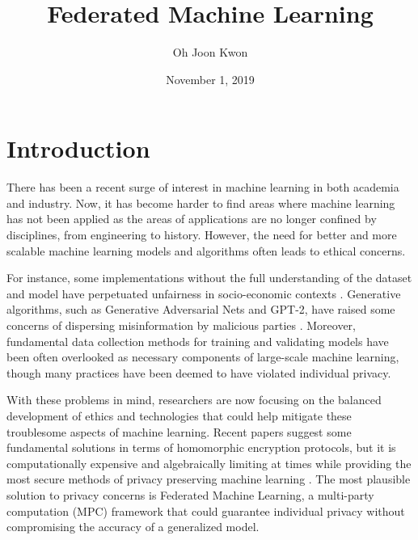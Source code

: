 \documentclass[12pt]{article}
\begin{document}
	\title{\vspace{-10mm}Federated Machine Learning}
	\author{Oh Joon Kwon}
	\date{November 1, 2019}

	\maketitle
	
	\section{Introduction}
	
	There has been a recent surge of interest in machine learning in both academia and industry. Now, it has become harder to find areas where machine learning has not been applied as the areas of applications are no longer confined by disciplines, from engineering to history. However, the need for better and more scalable machine learning models and algorithms often leads to ethical concerns. 
	
	\vspace{3mm}
	
	\noindent For instance, some implementations without the full understanding of the dataset and model have perpetuated unfairness in socio-economic contexts \cite{nnorient}. Generative algorithms, such as Generative Adversarial Nets and GPT-2, have raised some concerns of dispersing misinformation by malicious parties \cite{leak}. Moreover, fundamental data collection methods for training and validating models have been often overlooked as necessary components of large-scale machine learning, though many practices have been deemed to have violated individual privacy.
	
	\vspace{3mm}
	
	\noindent With these problems in mind, researchers are now focusing on the balanced development of ethics and technologies that could help mitigate these troublesome aspects of machine learning. Recent papers suggest some fundamental solutions in terms of homomorphic encryption protocols, but it is computationally expensive and algebraically limiting at times while providing the most secure methods of privacy preserving machine learning \cite{ppml}.  The most plausible solution to privacy concerns is Federated Machine Learning, a multi-party computation (MPC) framework that could guarantee individual privacy without compromising the accuracy of a generalized model. 
	
	\vspace{3mm}
	
\end{document}
